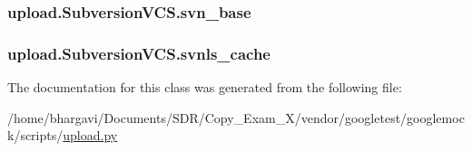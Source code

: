 \subsubsection[{\texorpdfstring{svn\+\_\+base}{svn_base}}]{\setlength{\rightskip}{0pt plus 5cm}upload.\+Subversion\+V\+C\+S.\+svn\+\_\+base}\hypertarget{classupload_1_1_subversion_v_c_s_a60645c40d2fea4cd52881576bd13341f}{}\label{classupload_1_1_subversion_v_c_s_a60645c40d2fea4cd52881576bd13341f}
\subsubsection[{\texorpdfstring{svnls\+\_\+cache}{svnls_cache}}]{\setlength{\rightskip}{0pt plus 5cm}upload.\+Subversion\+V\+C\+S.\+svnls\+\_\+cache}\hypertarget{classupload_1_1_subversion_v_c_s_aa801782f807674b06f491df5d7ca9942}{}\label{classupload_1_1_subversion_v_c_s_aa801782f807674b06f491df5d7ca9942}


The documentation for this class was generated from the following file\+:\begin{DoxyCompactItemize}
\item 
/home/bhargavi/\+Documents/\+S\+D\+R/\+Copy\+\_\+\+Exam\+\_\+X/vendor/googletest/googlemock/scripts/\hyperlink{googlemock_2scripts_2upload_8py}{upload.\+py}\end{DoxyCompactItemize}
